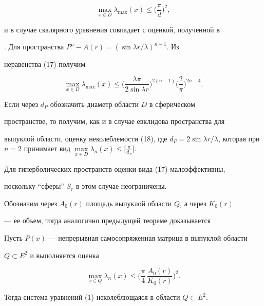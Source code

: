 \begin{pf}
$$ 


\max_{x\in D}\lambda_{\max}(x)\le\bigg( 


\frac{\pi}{d}\bigg)^2,


$$ 


и в случае скалярного уравнения совпадает с оценкой, полученной в 


\cite{7}. Для пространства $P^n-A(r)=(\sin\lambda r/\lambda)^{n-1}$. Из 


неравенства (17) получим 


$$ 


\max_{x\in D}\lambda_{\max}(x)\le\bigg( 


\frac{\lambda\pi}{2\sin\lambda r}\bigg)^{2(n-1)} 


\bigg(\frac{2}{\pi}\bigg)^{2n-4}. 


$$ 


Если через $d_P$ обозначить диаметр области $D$ в сферическом 


пространстве, то получим, как и в случае евклидова пространства для 


выпуклой области, оценку неколеблемости (18), где $d_P=2\sin\lambda 


r/\lambda$, которая при $n=2$ принимает вид $\max\limits_{x\in 


D}\lambda_n(x)\le 


\big[\frac{\pi}{d_P}\big]$. 


\end{pf} 


 


Для гиперболических пространств оценки вида (17) малоэффективны, 


поскольку ``сферы'' $S_r$ в этом случае неограничены. 


 


Обозначим через $A_0(r)$ площадь выпуклой области $Q$, а через $K_0(r)$ 


--- ее объем, тогда аналогично предыдущей теореме доказывается 


 


\begin{cor} 


Пусть $P(x)$ --- непрерывная самосопряженная матрица в выпуклой области 


$Q\subset E^2$ и выполняется оценка 


\begin{equation} 


\max_{x\in Q}\lambda_n(x)\le\bigg( 


\frac{\pi}{4}\,\frac{A_0(r)}{K_0(r)}\bigg)^2. 


\end{equation} 


Тогда система уравнений (1) неколеблющаяся в области $Q\subset E^2$. 


\end{cor} 


